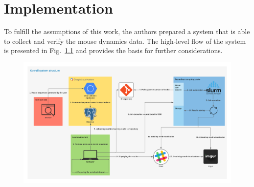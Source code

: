 \chapter{Implementation}\label{ch:implementation}
To fulfill the assumptions of this work, the authors prepared a system that is able to collect and verify the mouse dynamics data.
The high-level flow of the system is presented in Fig.~\ref{fig:overall_system_structure} and provides the basis for further considerations.
\begin{figure}[!hbt]
    \includegraphics[width=\linewidth]{resources/overall_system_structure}
    \label{fig:overall_system_structure}
\end{figure}

